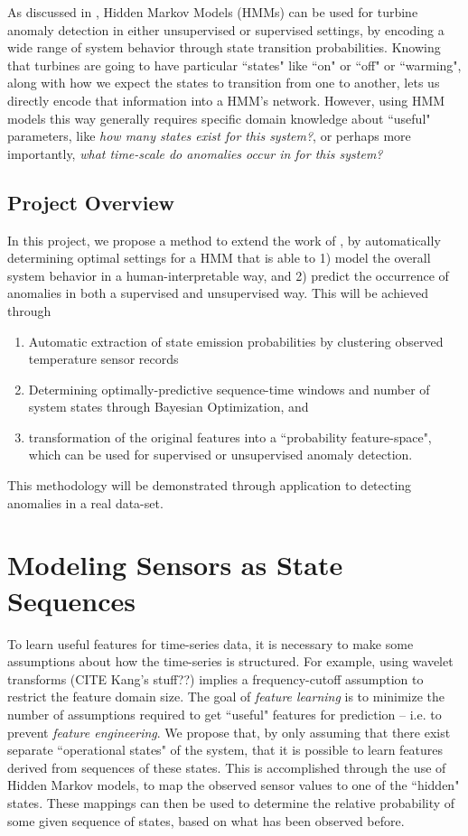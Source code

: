 \documentclass[twocolumn,10pt]{article}
\begin{document}
As discussed in \citet{gas_turbine}, Hidden Markov Models (HMMs) can be used for turbine anomaly detection in either unsupervised or supervised settings, by encoding a wide range of system behavior through state transition probabilities. Knowing that turbines are going to have particular ``states" like ``on" or ``off" or ``warming", along with how we expect the states to transition from one to another, lets us directly encode that information into a HMM's network. However, using HMM models this way generally requires specific domain knowledge about ``useful" parameters, like \textit{how many states exist for this system?}, or perhaps more importantly, \textit{what time-scale do anomalies occur in for this system?}

\subsection{Project Overview}
In this project, we propose a method to extend the work of \citet{gas_turbine}, by automatically determining optimal settings for a HMM that is able to 1) model the overall system behavior in a human-interpretable way, and 2) predict the occurrence of anomalies in both a supervised and unsupervised way. 
This will be achieved through 
\begin{enumerate}
    \item Automatic extraction of state emission probabilities by clustering observed temperature sensor records
    \item Determining optimally-predictive sequence-time windows and number of system states through Bayesian Optimization, and
    \item transformation of the original features into a ``probability feature-space", which can be used for supervised or unsupervised anomaly detection. 
\end{enumerate}

This methodology will be demonstrated through application to detecting anomalies in a real data-set.

\section{Modeling Sensors as State Sequences}
To learn useful features for time-series data, it is necessary to make some assumptions about how the time-series is structured. For example, using wavelet transforms (CITE Kang's stuff??) implies a frequency-cutoff assumption to restrict the feature domain size. The goal of \textit{feature learning} is to minimize the number of assumptions required to get ``useful" features for prediction -- i.e. to prevent \textit{feature engineering}. We propose that, by only assuming that there exist separate ``operational states" of the system, that it is possible to learn features derived from sequences of these states. This is accomplished through the use of Hidden Markov models, to map the observed sensor values to one of the ``hidden" states. These mappings can then be used to determine the relative probability of some given sequence of states, based on what has been observed before.
\end{document}
